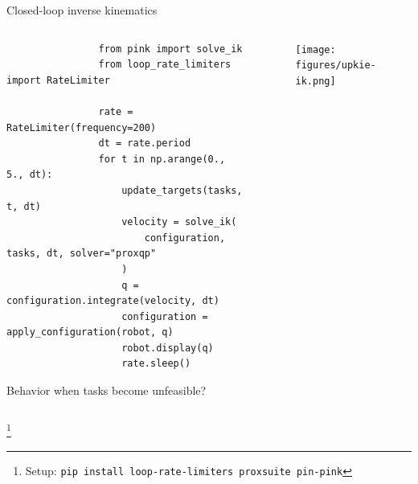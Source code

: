 \documentclass[9pt, aspectratio=43]{beamer}
\newcommand\blfootnote[1]{%
  \begingroup
  \renewcommand\thefootnote{}%
  \footnote{#1}%
  \addtocounter{footnote}{-1}%
  \endgroup
}
\begin{document}
\begin{frame}[fragile]{Closed-loop inverse kinematics}
    \begin{columns}
        \begin{column}{0.75\columnwidth}
            \begin{verbatim}
                from pink import solve_ik
                from loop_rate_limiters import RateLimiter

                rate = RateLimiter(frequency=200)
                dt = rate.period
                for t in np.arange(0., 5., dt):
                    update_targets(tasks, t, dt)
                    velocity = solve_ik(
                        configuration, tasks, dt, solver="proxqp"
                    )
                    q = configuration.integrate(velocity, dt)
                    configuration = apply_configuration(robot, q)
                    robot.display(q)
                    rate.sleep()
            \end{verbatim}
            Behavior when tasks become unfeasible?
        \end{column}
        \begin{column}{0.24\columnwidth}
            \begin{figure}
                \centering
                \texttt{[image: figures/upkie-ik.png]}
            \end{figure}
        \end{column}
    \end{columns}
    \blfootnote{
        Setup: \texttt{pip install loop-rate-limiters proxsuite pin-pink}
    }
\end{frame}

\end{document}
